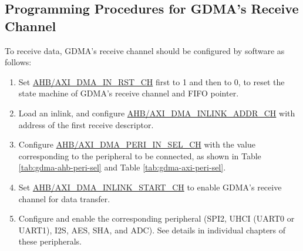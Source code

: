 \documentclass[main\_\_EN.tex]{subfiles}
\begin{document}
\subsection{Programming Procedures for GDMA's Receive Channel}
To receive data, GDMA's receive channel should be configured by software as follows:
\begin{enumerate}
    \item Set \hyperref[fielddesc:AHBDMAINRSTCHN]{AHB/AXI\_DMA\_IN\_RST\_CH} first to 1 and then to 0, to reset the state machine of GDMA's receive channel and FIFO pointer.
    \item Load an inlink, and configure \hyperref[fielddesc:AHBDMAINLINKADDRCHN]{AHB/AXI\_DMA\_INLINK\_ADDR\_CH} with address of the first receive descriptor.
    \item Configure \hyperref[fielddesc:AHBDMAPERIINSELCHN]{AHB/AXI\_DMA\_PERI\_IN\_SEL\_CH} with the value corresponding to the peripheral to be connected, as shown in Table \ref{tab:gdma-ahb-peri-sel} and Table \ref{tab:gdma-axi-peri-sel}.
    \item Set \hyperref[fielddesc:AHBDMAINLINKSTARTCHN]{AHB/AXI\_DMA\_INLINK\_START\_CH} to enable GDMA's receive channel for data transfer.
    \item Configure and enable the corresponding peripheral (SPI2, UHCI (UART0 or UART1), I2S, AES, SHA, and ADC). See details in individual chapters of these peripherals.
\end{enumerate}
\end{document}
